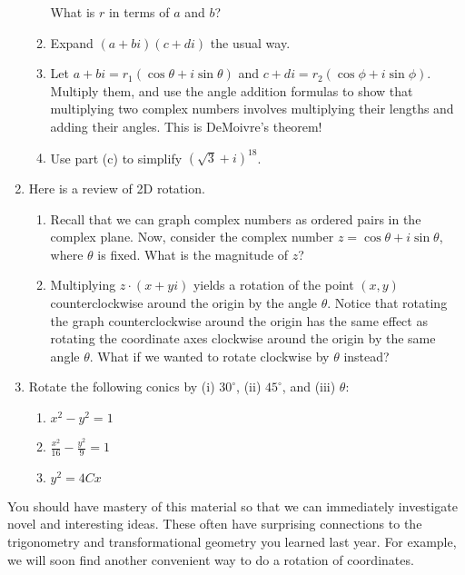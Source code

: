 \documentclass[../gatm.tex]{subfiles}
\begin{document}
\begin{enumerate}
\begin{enumerate}
What is $r$ in terms of $a$ and $b$?
\item Expand $(a+bi)(c+di)$ the usual way.
\item Let $a+bi=r_1(\cos\theta + i\sin\theta)$ and $c+di=r_2(\cos\phi + i\sin\phi)$. Multiply them, and use the angle addition formulas to show that multiplying two complex numbers involves multiplying their lengths and adding their angles. This is DeMoivre's theorem!
\item Use part (c) to simplify $(\sqrt{3}+i)^{18}$.
\end{enumerate}
\item Here is a review of 2D rotation.
\begin{enumerate}
\item Recall that we can graph complex numbers as ordered pairs in the complex plane. Now, consider the complex number $z=\cos \theta + i\sin\theta$, where $\theta$ is fixed. What is the magnitude of $z$?
\item Multiplying $z\cdot(x+yi)$ yields a rotation of the point $(x,y)$ counterclockwise around the origin by the angle $\theta$. Notice that rotating the graph counterclockwise around the origin has the same effect as rotating the coordinate axes clockwise around the origin by the same angle $\theta$. What if we wanted to rotate clockwise by $\theta$ instead?
\end{enumerate}
\item Rotate the following conics by (i) $30^\circ$, (ii) $45^\circ$, and (iii) $\theta$:
\begin{multicols}{3}
\begin{enumerate}
\item $x^2-y^2=1$
\item $\frac{x^2}{16}-\frac{y^2}{9}=1$
\item $y^2=4Cx$
\end{enumerate}
\end{multicols}
\end{enumerate}

\noindent You should have mastery of this material so that we can immediately investigate novel and interesting ideas. These often have surprising connections to the trigonometry and transformational geometry you learned last year. For example, we will soon find another convenient way to do a rotation of coordinates.
\end{document}
